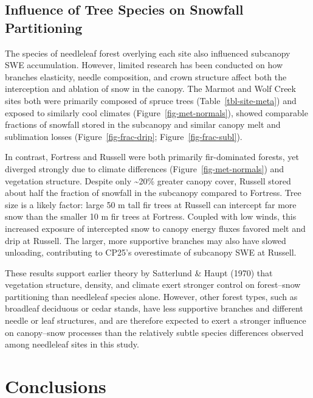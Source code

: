\documentclass[
  letterpaper,
]{tex/uofsthesis-cs}
\begin{document}
\subsection{Influence of Tree Species on Snowfall
Partitioning}\label{influence-of-tree-species-on-snowfall-partitioning}

The species of needleleaf forest overlying each site also influenced
subcanopy SWE accumulation. However, limited research has been conducted
on how branches elasticity, needle composition, and crown structure
affect both the interception and ablation of snow in the canopy. The
Marmot and Wolf Creek sites both were primarily composed of spruce trees
(Table~\ref{tbl-site-meta}) and exposed to similarly cool climates
(Figure~\ref{fig-met-normals}), showed comparable fractions of snowfall
stored in the subcanopy and similar canopy melt and sublimation losses
(Figure~\ref{fig-frac-drip}; Figure~\ref{fig-frac-subl}).

In contrast, Fortress and Russell were both primarily fir-dominated
forests, yet diverged strongly due to climate differences
(Figure~\ref{fig-met-normals}) and vegetation structure. Despite only
\textasciitilde20\% greater canopy cover, Russell stored about half the
fraction of snowfall in the subcanopy compared to Fortress. Tree size is
a likely factor: large 50 m tall fir trees at Russell can intercept far
more snow than the smaller 10 m fir trees at Fortress. Coupled with low
winds, this increased exposure of intercepted snow to canopy energy
fluxes favored melt and drip at Russell. The larger, more supportive
branches may also have slowed unloading, contributing to CP25's
overestimate of subcanopy SWE at Russell.

These results support earlier theory by Satterlund \& Haupt (1970) that
vegetation structure, density, and climate exert stronger control on
forest--snow partitioning than needleleaf species alone. However, other
forest types, such as broadleaf deciduous or cedar stands, have less
supportive branches and different needle or leaf structures, and are
therefore expected to exert a stronger influence on canopy--snow
processes than the relatively subtle species differences observed among
needleleaf sites in this study.

\section{Conclusions}\label{conclusions-3}
\end{document}
